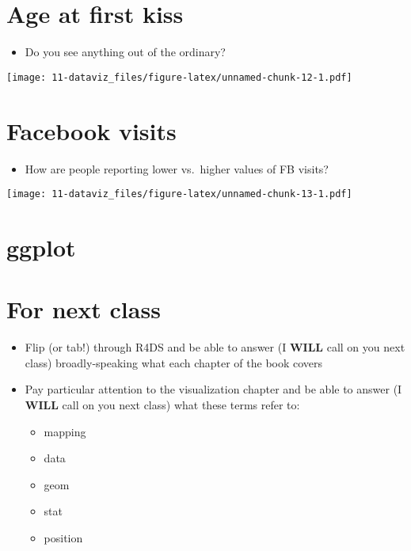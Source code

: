 \documentclass[
]{book}
\providecommand{\tightlist}{%
  \setlength{\itemsep}{0pt}\setlength{\parskip}{0pt}}
\theoremstyle{definition}
\theoremstyle{definition}
\theoremstyle{definition}
\theoremstyle{definition}
\theoremstyle{remark}
\begin{document}
\hypertarget{age-at-first-kiss-1}{%
\section{Age at first kiss}\label{age-at-first-kiss-1}}

\begin{itemize}
\tightlist
\item
  Do you see anything out of the ordinary?
\end{itemize}

\texttt{[image: 11-dataviz\_files/figure-latex/unnamed-chunk-12-1.pdf]}

\hypertarget{facebook-visits-1}{%
\section{Facebook visits}\label{facebook-visits-1}}

\begin{itemize}
\tightlist
\item
  How are people reporting lower vs.~higher values of FB visits?
\end{itemize}

\texttt{[image: 11-dataviz\_files/figure-latex/unnamed-chunk-13-1.pdf]}

\hypertarget{ggplot}{%
\section{ggplot}\label{ggplot}}

\hypertarget{for-next-class}{%
\section{For next class}\label{for-next-class}}

\begin{itemize}
\tightlist
\item
  Flip (or tab!) through R4DS and be able to answer (I \textbf{WILL} call on you next class) broadly-speaking what each chapter of the book covers
\item
  Pay particular attention to the visualization chapter and be able to answer (I \textbf{WILL} call on you next class) what these terms refer to:

  \begin{itemize}
  \tightlist
  \item
    mapping
  \item
    data
  \item
    geom
  \item
    stat
  \item
    position
  \end{itemize}
\end{itemize}
\end{document}
